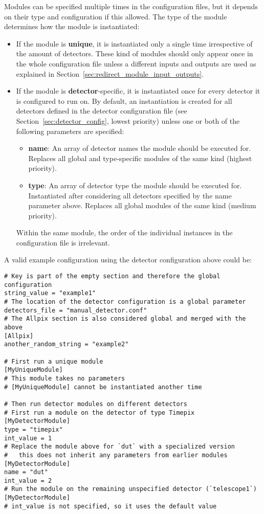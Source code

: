Modules can be specified multiple times in the configuration files, but it depends on their type and configuration if this allowed.
The type of the module determines how the module is instantiated:
\begin{itemize}
\item If the module is \textbf{unique}, it is instantiated only a single time irrespective of the amount of detectors.
These kind of modules should only appear once in the whole configuration file unless a different inputs and outputs are used as explained in Section~\ref{sec:redirect_module_input_outputs}.
\item If the module is \textbf{detector}-specific, it is instantiated once for every detector it is configured to run on.
By default, an instantiation is created for all detectors defined in the detector configuration file (see Section~\ref{sec:detector_config}, lowest priority) unless one or both of the following parameters are specified:
\begin{itemize}
\item \textbf{name}: An array of detector names the module should be executed for.
Replaces all global and type-specific modules of the same kind (highest priority).
\item \textbf{type}: An array of detector type the module should be executed for.
Instantiated after considering all detectors specified by the name parameter above.
Replaces all global modules of the same kind (medium priority).
\end{itemize}
Within the same module, the order of the individual instances in the configuration file is irrelevant.
\end{itemize}

A valid example configuration using the detector configuration above could be:
\begin{verbatim}
# Key is part of the empty section and therefore the global configuration
string_value = "example1"
# The location of the detector configuration is a global parameter
detectors_file = "manual_detector.conf"
# The Allpix section is also considered global and merged with the above
[Allpix]
another_random_string = "example2"

# First run a unique module
[MyUniqueModule]
# This module takes no parameters
# [MyUniqueModule] cannot be instantiated another time

# Then run detector modules on different detectors
# First run a module on the detector of type Timepix
[MyDetectorModule]
type = "timepix"
int_value = 1
# Replace the module above for `dut` with a specialized version
#   this does not inherit any parameters from earlier modules
[MyDetectorModule]
name = "dut"
int_value = 2
# Run the module on the remaining unspecified detector (`telescope1`)
[MyDetectorModule]
# int_value is not specified, so it uses the default value
\end{verbatim}

